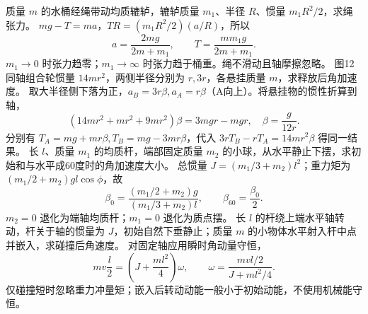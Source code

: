 \problemtext 质量 $m$ 的水桶经绳带动均质辘轳，辘轳质量 $m_1$、半径 $R$、惯量 $m_1R^2/2$，求绳张力。
\workings $mg-T=ma$，$TR=(m_1R^2/2)(a/R)$，所以
\[
a=\frac{2mg}{2m+m_1},\qquad T=\frac{mm_1g}{2m+m_1}.
\]
\crosscheck $m_1\to0$ 时张力趋零；$m_1\to\infty$ 时张力趋于桶重。绳不滑动且轴摩擦忽略。
\problemtext 图12同轴组合轮惯量 $14mr^2$，两侧半径分别为 $r,3r$，各悬挂质量 $m$，求释放后角加速度。
\workings 取大半径侧下落为正，$a_B=3r\beta,a_A=r\beta$（A向上）。将悬挂物的惯性折算到轴，
\[
(14mr^2+mr^2+9mr^2)\beta=3mgr-mgr,
\quad \beta=\frac{g}{12r}.
\]
\crosscheck 分别有 $T_A=mg+mr\beta,T_B=mg-3mr\beta$，代入 $3rT_B-rT_A=14mr^2\beta$ 得同一结果。
\problemtext 长 $l$、质量 $m_1$ 的均质杆，端部固定质量 $m_2$ 的小球，从水平静止下摆，求初始和与水平成60度时的角加速度大小。
\workings 总惯量 $J=(m_1/3+m_2)l^2$；重力矩为 $(m_1/2+m_2)gl\cos\phi$，故
\[
\beta_0=\frac{(m_1/2+m_2)g}{(m_1/3+m_2)l},\qquad
\beta_{60}=\frac{\beta_0}{2}.
\]
\crosscheck $m_2=0$ 退化为端轴均质杆；$m_1=0$ 退化为质点摆。
\problemtext 长 $l$ 的杆绕上端水平轴转动，杆关于轴的惯量为 $J$，初始自然下垂静止；质量 $m$ 的小物体水平射入杆中点并嵌入，求碰撞后角速度。
\workings 对固定轴应用瞬时角动量守恒，
\[
mv\frac l2=\left(J+\frac{ml^2}{4}\right)\omega,\qquad
\omega=\frac{mvl/2}{J+ml^2/4}.
\]
\crosscheck 仅碰撞短时忽略重力冲量矩；嵌入后转动动能一般小于初始动能，不使用机械能守恒。
